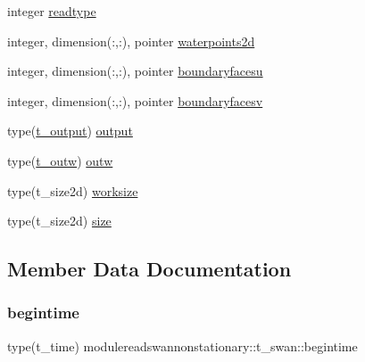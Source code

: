 \begin{DoxyCompactItemize}
\item 
integer \mbox{\hyperlink{structmodulereadswannonstationary_1_1t__swan_a86fdc4766a0065e2d5f50ebb425481c2}{readtype}}
\item 
integer, dimension(\+:,\+:), pointer \mbox{\hyperlink{structmodulereadswannonstationary_1_1t__swan_a69b9512c5928ff9b1f855040ac5ffecc}{waterpoints2d}}
\item 
integer, dimension(\+:,\+:), pointer \mbox{\hyperlink{structmodulereadswannonstationary_1_1t__swan_a7531fa4607bdfb3ca1a614ae42e434de}{boundaryfacesu}}
\item 
integer, dimension(\+:,\+:), pointer \mbox{\hyperlink{structmodulereadswannonstationary_1_1t__swan_a0d8ea0f63ebc46a99463fe14def4a152}{boundaryfacesv}}
\item 
type(\mbox{\hyperlink{structmodulereadswannonstationary_1_1t__output}{t\+\_\+output}}) \mbox{\hyperlink{structmodulereadswannonstationary_1_1t__swan_affff3cad10a69dba90a1b6b53ae77909}{output}}
\item 
type(\mbox{\hyperlink{structmodulereadswannonstationary_1_1t__outw}{t\+\_\+outw}}) \mbox{\hyperlink{structmodulereadswannonstationary_1_1t__swan_a10f7f4806d236fe8ab664c71f0c33c96}{outw}}
\item 
type(t\+\_\+size2d) \mbox{\hyperlink{structmodulereadswannonstationary_1_1t__swan_a0a04540594fa11ccd7c6daf7247fc060}{worksize}}
\item 
type(t\+\_\+size2d) \mbox{\hyperlink{structmodulereadswannonstationary_1_1t__swan_a0bbf968b8c1afead2c6a5dbbefb1c86f}{size}}
\end{DoxyCompactItemize}


\subsection{Member Data Documentation}
\mbox{\label{structmodulereadswannonstationary_1_1t__swan_ab446d8e5935a991eaedb98b43cf1a62d}} 
\subsubsection{\texorpdfstring{begintime}{begintime}}
{\footnotesize\ttfamily type(t\+\_\+time) modulereadswannonstationary\+::t\+\_\+swan\+::begintime\hspace{0.3cm}{\ttfamily [private]}}

